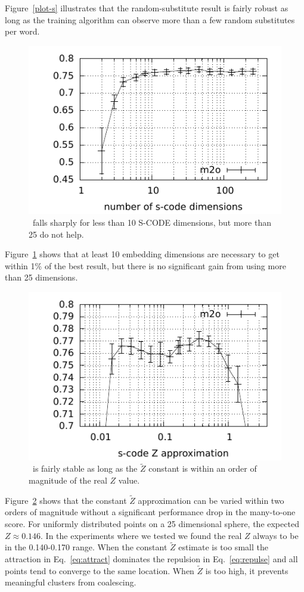Figure~\ref{plot-s} illustrates that the
random-substitute result is fairly robust as long as the training
algorithm can observe more than a few random substitutes per word.

\begin{figure}[ht] \centering
\includegraphics[width=0.5\linewidth]{plot-d-cl.pdf}
\caption{\mto\ falls sharply for less than 10 S-CODE dimensions, but
  more than 25 do not help.}
\label{plot-d}
\end{figure}

Figure~\ref{plot-d} shows that at least 10 embedding dimensions are
necessary to get within 1\% of the best result, but there is no
significant gain from using more than 25 dimensions.

\begin{figure}[ht] \centering
\includegraphics[width=0.5\linewidth]{plot-z-cl.pdf}
\caption{\mto\ is fairly stable as long as the $\tilde{Z}$ constant is
  within an order of magnitude of the real $Z$ value.}
\label{plot-z}
\end{figure}

Figure~\ref{plot-z} shows that the constant $\tilde{Z}$ approximation
can be varied within two orders of magnitude without a significant
performance drop in the many-to-one score.  For uniformly distributed
points on a 25 dimensional sphere, the expected $Z\approx 0.146$.  In
the experiments where we tested we found the real $Z$ always to be in
the 0.140-0.170 range.  When the constant $\tilde{Z}$ estimate is too
small the attraction in Eq.~\ref{eq:attract} dominates the repulsion
in Eq.~\ref{eq:repulse} and all points tend to converge to the same
location.  When $\tilde{Z}$ is too high, it prevents meaningful
clusters from coalescing.

